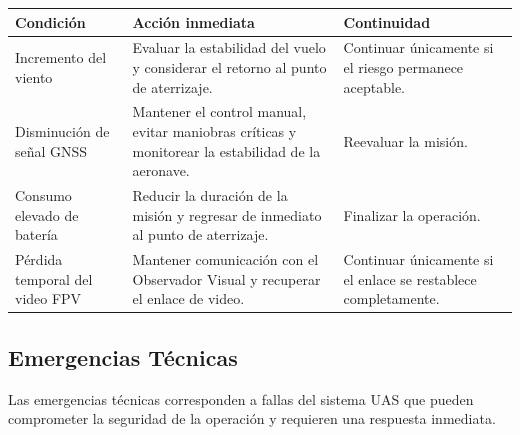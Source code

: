 \begin{longtable}{|p{4.5cm}|p{6cm}|p{3.5cm}|}
\hline

\textbf{Condición} &
\textbf{Acción inmediata} &
\textbf{Continuidad}

\\ \hline

Incremento del viento &
Evaluar la estabilidad del vuelo y considerar el retorno al punto de aterrizaje. &
Continuar únicamente si el riesgo permanece aceptable.

\\ \hline

Disminución de señal GNSS &
Mantener el control manual, evitar maniobras críticas y monitorear la estabilidad de la aeronave. &
Reevaluar la misión.

\\ \hline

Consumo elevado de batería &
Reducir la duración de la misión y regresar de inmediato al punto de aterrizaje. &
Finalizar la operación.

\\ \hline

Pérdida temporal del video FPV &
Mantener comunicación con el Observador Visual y recuperar el enlace de video. &
Continuar únicamente si el enlace se restablece completamente.

\\ \hline

\end{longtable}




\subsection{Emergencias Técnicas}

Las emergencias técnicas corresponden a fallas del sistema UAS que pueden comprometer la seguridad de la operación y requieren una respuesta inmediata.

\renewcommand{\arraystretch}{1.4}

